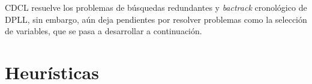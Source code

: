 



CDCL resuelve los problemas de b\'usquedas redundantes y \textit{bactrack} cronol\'ogico de DPLL, sin embargo, a\'un deja pendientes por resolver problemas como la selecci\'on de variables, que se pasa a desarrollar a continuaci\'on.


\section{Heur\'isticas}
\label{sec:heuristicas}

